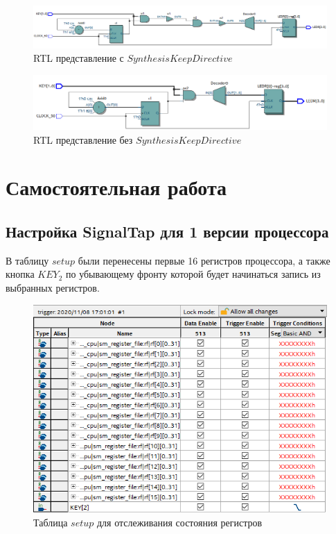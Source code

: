 \documentclass[a4paper,14pt]{article}
\begin{document}
	\begin{figure}[H]
		\centering
		\includegraphics[width=0.7\linewidth]{images/rtl_1}
		\caption{RTL представление с $Synthesis Keep Directive$}
		\label{fig:rtl1}
	\end{figure}
	
	
	\begin{figure}[H]
		\centering
		\includegraphics[width=0.7\linewidth]{images/rtl_2}
		\caption{RTL представление без $Synthesis Keep Directive$}
		\label{fig:rtl2}
	\end{figure}	
	
	\section{Самостоятельная работа}
	
	\subsection{Настройка SignalTap для 1 версии процессора}
	
	В таблицу $setup$ были перенесены первые 16 регистров процессора, а также кнопка $KEY_2$ по убывающему фронту которой будет начинаться запись из выбранных регистров.
	
	\begin{figure}[H]
		\centering
		\includegraphics[width=0.7\linewidth]{images/view_registers}
		\caption{Таблица $setup$ для отслеживания состояния регистров}
		\label{fig:viewregisters}
	\end{figure}
	
\end{document}
